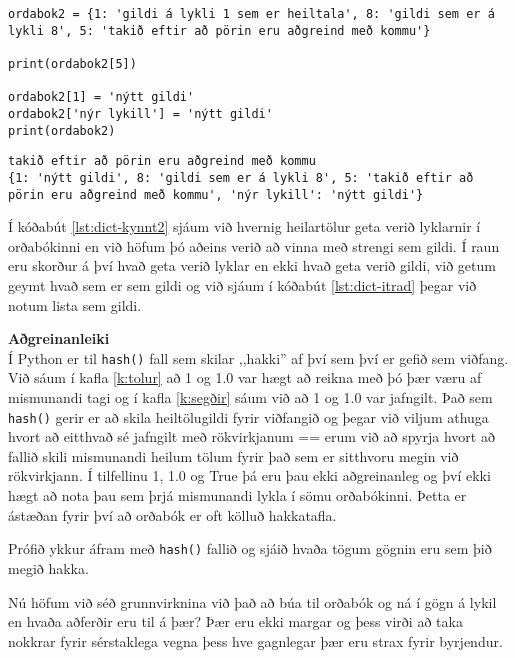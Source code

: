 \begin{lstlisting}[caption=Gögnum bætt við og þau tekin út, label=lst:dict-kynnt2]
ordabok2 = {1: 'gildi á lykli 1 sem er heiltala', 8: 'gildi sem er á lykli 8', 5: 'takið eftir að pörin eru aðgreind með kommu'}

print(ordabok2[5])

ordabok2[1] = 'nýtt gildi' 
ordabok2['nýr lykill'] = 'nýtt gildi'
print(ordabok2)
\end{lstlisting}
\lstset{style=uttak}
\begin{lstlisting}
takið eftir að pörin eru aðgreind með kommu
{1: 'nýtt gildi', 8: 'gildi sem er á lykli 8', 5: 'takið eftir að pörin eru aðgreind með kommu', 'nýr lykill': 'nýtt gildi'}
\end{lstlisting}
\lstset{style=venjulegt}

Í kóðabút \ref{lst:dict-kynnt2} sjáum við hvernig heilartölur geta verið lyklarnir í orðabókinni en við höfum þó aðeins verið að vinna með strengi sem gildi.
Í raun eru skorður á því hvað geta verið lyklar en ekki hvað geta verið gildi, við getum geymt hvað sem er sem gildi og við sjáum í kóðabút \ref{lst:dict-itrad} þegar við notum lista sem gildi.

\begin{itarefni}
\textbf{Aðgreinanleiki}\\
Í Python er til \texttt{hash()} fall sem skilar ,,hakki'' af því sem því er gefið sem viðfang.
Við sáum í kafla \ref{k:tolur} að 1 og 1.0 var hægt að reikna með þó þær væru af mismunandi tagi og í kafla \ref{k:segðir} sáum við að 1 og 1.0 var jafngilt.
Það sem \texttt{hash()} gerir er að skila heiltölugildi fyrir viðfangið og þegar við viljum athuga hvort að eitthvað sé jafngilt með rökvirkjanum == erum við að spyrja hvort að fallið skili mismunandi heilum tölum fyrir það sem er sitthvoru megin við rökvirkjann.
Í tilfellinu 1, 1.0 og True þá eru þau ekki aðgreinanleg og því ekki hægt að nota þau sem þrjá mismunandi lykla í sömu orðabókinni.
Þetta er ástæðan fyrir því að orðabók er oft kölluð hakkatafla.

Prófið ykkur áfram með \texttt{hash()} fallið og sjáið hvaða tögum gögnin eru sem þið megið hakka. 
\end{itarefni}

Nú höfum við séð grunnvirknina við það að búa til orðabók og ná í gögn á lykil en hvaða aðferðir eru til á þær?
Þær eru ekki margar og þess virði að taka nokkrar fyrir sérstaklega vegna þess hve gagnlegar þær eru strax fyrir byrjendur.


